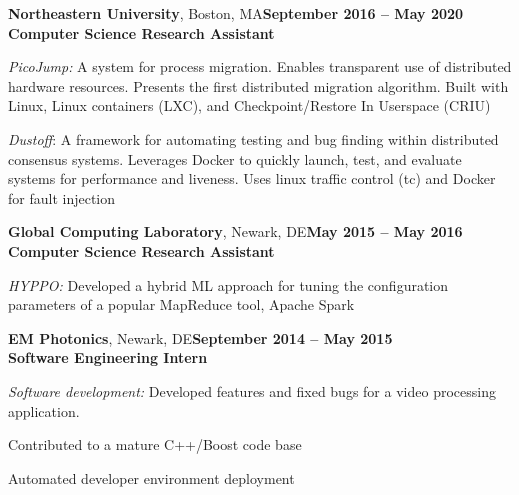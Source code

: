 \documentclass[margin,line]{resume}
\begin{document}
\begin{resume}
\textbf{Northeastern University}, Boston, MA\hfill\textbf{September 2016 -- May 2020}\\
\textbf{Computer Science Research Assistant}\hfill 
\vspace{-3mm}\\\vspace{-1mm}
\begin{list2}
	\item \filbreak\textit{PicoJump:} A system for process migration. Enables
    transparent use of distributed hardware resources. Presents the first
    distributed migration algorithm. Built with Linux, Linux containers (LXC),
    and Checkpoint/Restore In Userspace (CRIU)
    \item \filbreak\textit{Dustoff}: A framework for automating testing and bug
    finding within distributed consensus systems. Leverages Docker to quickly
    launch, test, and evaluate systems for performance and liveness. Uses linux
    traffic control (tc) and Docker for fault injection
\end{list2}

\textbf{Global Computing Laboratory}, Newark, DE\hfill\textbf{May 2015 -- May 2016}\\
\textbf{Computer Science Research Assistant}\hfill 
\vspace{-3mm}\\\vspace{-1mm}
\begin{list2}
	\item \filbreak\textit{HYPPO:} Developed a hybrid ML approach for tuning the
    configuration parameters of a popular MapReduce tool, Apache Spark
\end{list2}

\textbf{EM Photonics}, Newark, DE\hfill\textbf{September 2014 -- May 2015}\\
\textbf{Software Engineering Intern}\hfill 
\vspace{-3mm}\\\vspace{-1mm}
\begin{list2}
	\item \filbreak\textit{Software development:} Developed features and fixed bugs for a video processing application.
    \item \filbreak Contributed to a mature C++/Boost code base
    \item \filbreak Automated developer environment deployment
\end{list2}


\end{resume}
\end{document}
